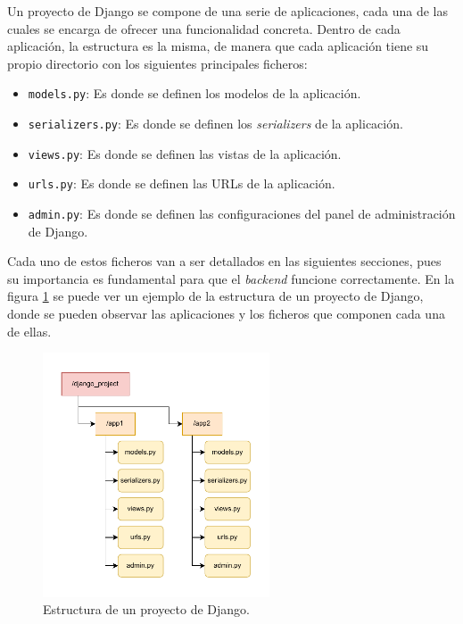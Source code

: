 Un proyecto de Django se compone de una serie de aplicaciones, cada una de las cuales se encarga de ofrecer una funcionalidad concreta. Dentro de cada aplicación, la estructura es la misma, de manera que cada aplicación tiene su propio directorio con los siguientes principales ficheros:

\begin{itemize}
    \item \texttt{models.py}: Es donde se definen los modelos de la aplicación.
    \item \texttt{serializers.py}: Es donde se definen los \textit{serializers} de la aplicación.
    \item \texttt{views.py}: Es donde se definen las vistas de la aplicación.
    \item \texttt{urls.py}: Es donde se definen las URLs de la aplicación.
    \item \texttt{admin.py}: Es donde se definen las configuraciones del panel de administración de Django.
\end{itemize}

Cada uno de estos ficheros van a ser detallados en las siguientes secciones, pues su importancia es fundamental para que el \textit{backend} funcione correctamente. En la figura \ref{dev:fig:estructura_django} se puede ver un ejemplo de la estructura de un proyecto de Django, donde se pueden observar las aplicaciones y los ficheros que componen cada una de ellas.

\begin{figure}
    \centering
    \includegraphics[width=0.6\textwidth]{figures/design_develop/estructura_django.pdf}
    \caption{Estructura de un proyecto de Django.}
    \label{dev:fig:estructura_django}
\end{figure}


